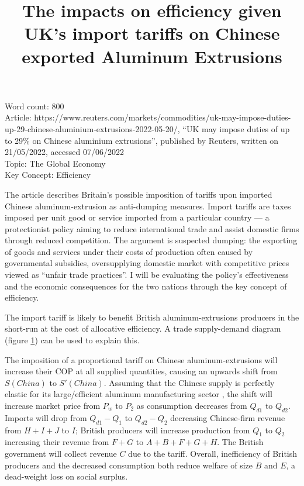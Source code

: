 \documentclass[a4paper,12pt]{article}
\title{The impacts on efficiency given UK's import tariffs on Chinese exported Aluminum Extrusions}
\author{\vspace{-8ex}}
\date{\vspace{-8ex}}
\newcommand{\tikzfig}[1]{}
\newcommand{\initTexcount}[1]{\immediate\write18{texcount -inc -incbib
		-sum #1 > .wordcount.tex}}
\newcommand\wordcount{
		}
\begin{document}
\maketitle
Word count: 800\\
Article: https://www.reuters.com/markets/commodities/uk-may-impose-duties-up-29-chinese-aluminium-extrusions-2022-05-20/, ``UK may impose duties of up to 29\% on Chinese aluminium extrusions'', published by Reuters, written on 21/05/2022, accessed 07/06/2022\\
Topic: The Global Economy\\
Key Concept: Efficiency


\newpage



The article describes Britain's possible imposition of tariffs upon imported Chinese aluminum-extrusion as anti-dumping measures. Import tariffs are taxes imposed per unit good or service imported from a particular country --- a protectionist policy aiming to reduce international trade and assist domestic firms through reduced competition. The argument is suspected dumping: the exporting of goods and services under their costs of production often caused by governmental subsidies, oversupplying domestic market with competitive prices viewed as ``unfair trade practices''. I will be evaluating the policy's effectiveness and the economic consequences for the two nations through the key concept of efficiency.

The import tariff is likely to benefit British aluminum-extrusions producers in the short-run at the cost of allocative efficiency. A trade supply-demand diagram (figure \ref{fig:tariff}) can be used to explain this.

\begin{figure}[H]
	\centering
	 \tikzfig{assets/tariffs.txt}
	\caption{}
	\label{fig:tariff}
\end{figure}

The imposition of a proportional tariff on Chinese aluminum-extrusions will increase their COP at all supplied quantities, causing an upwards shift from $S(China)$ to $S'(China)$. Assuming that the Chinese supply is perfectly elastic for its large/efficient aluminum manufacturing sector \parencite{ilzetzki_2022}, the shift will increase market price from $P_w$ to $P_2$ as consumption decreases from $Q_{d1}$ to $Q_{d2}$.
Imports will drop from $Q_{d1}-Q_{1}$ to $Q_{d2}-Q_{2}$ decreasing Chinese-firm revenue from $H+I+J$ to $I$; British producers will increase production from $Q_1$ to $Q_2$ increasing their revenue from $F+G$ to $A+B+F+G+H$. The British government will collect revenue $C$ due to the tariff. Overall, inefficiency of British producers and the decreased consumption both reduce welfare of size $B$ and $E$, a dead-weight loss on social surplus.
\end{document}

